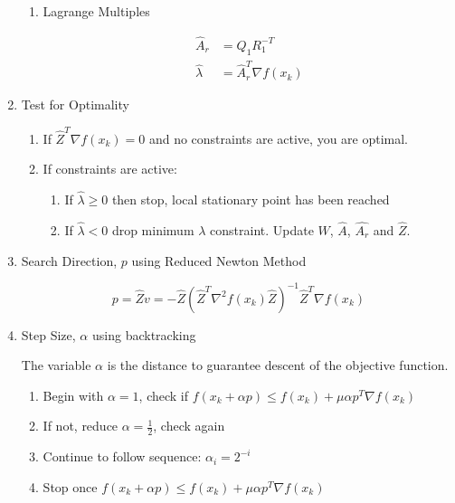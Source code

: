 \documentclass{article}
\begin{document}
\begin{enumerate}
\begin{enumerate}
        \item Lagrange Multiples
    
            \begin{equation*}
            \begin{aligned}
                \hat{A}_{r} & = Q_{1}R_{1}^{-T} \\
                \hat{\lambda} & = \hat{A}^{T}_{r}\nabla f(x_{k})
            \end{aligned}
            \end{equation*}
    \end{enumerate}

    
        
    \item Test for Optimality
    \begin{enumerate}
        \item If $\hat{Z}^{T}\nabla f(x_{k}) = 0$ and no constraints are active, you are optimal.
        \item If constraints are active: 
        \begin{enumerate}
            \item If $\hat{\lambda} \geq 0$ then stop, local stationary point has been reached
            \item If $\hat{\lambda} < 0$ drop minimum $\lambda$ constraint. Update $W$, $\hat{A}$, $\hat{A_{r}}$ and $\hat{Z}$.
        \end{enumerate}
    \end{enumerate}

    \item Search Direction, $p$ using Reduced Newton Method

    $$p = \hat{Z}v = -\hat{Z}(\hat{Z}^{T}\nabla^2 f(x_k)\hat{Z})^{-1}\hat{Z}^{T}\nabla f(x_{k})$$
    
    \item Step Size, $\alpha$ using backtracking
    
    The variable $\alpha$ is the distance to guarantee descent of the objective function.
    
    \begin{enumerate}
        \item Begin with $\alpha = 1$, check if $f(x_{k} + \alpha p) \leq f(x_{k}) + \mu \alpha p^T \nabla f(x_k)$
        \item If not, reduce $\alpha = \frac{1}{2}$, check again
        \item Continue to follow sequence: $\alpha_{i} = 2^{-i}$
        \item Stop once $f(x_{k} + \alpha p) \leq f(x_{k}) + \mu \alpha p^T \nabla f(x_k)$
    \end{enumerate}
    

\end{enumerate}
\end{document}
